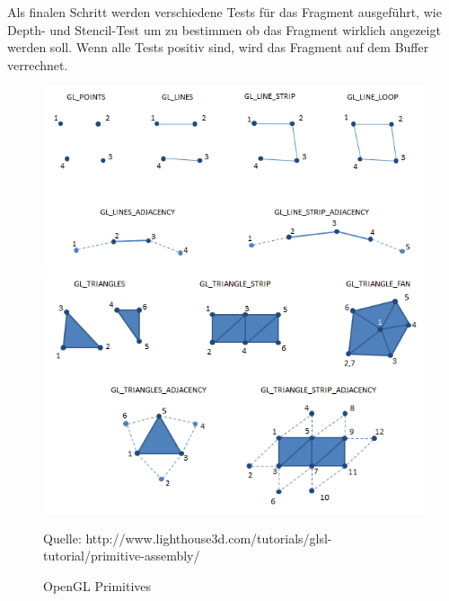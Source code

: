 Als finalen Schritt werden verschiedene Tests für das Fragment ausgeführt, wie Depth- und Stencil-Test um zu bestimmen ob das Fragment wirklich angezeigt werden soll. Wenn alle Tests positiv sind, wird das Fragment %
auf dem Buffer verrechnet.
\begin{figure}
	\centering
	\includegraphics[scale=0.7]{02theorie/openglPrimitives.png}
	\includegraphics[scale=0.7]{02theorie/openglPrimitives2.png}
	
	
	Quelle: http://www.lighthouse3d.com/tutorials/glsl-tutorial/primitive-assembly/
	\caption{OpenGL Primitives}\label{OpenGLPrimitives}
\end{figure}


